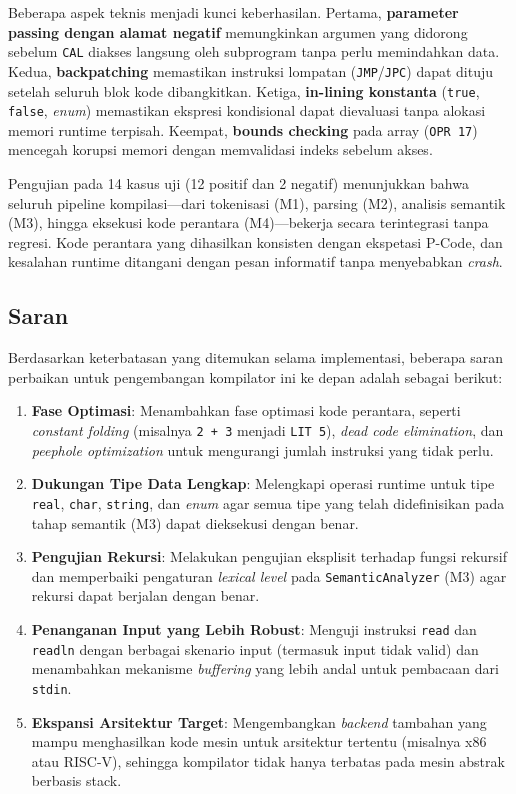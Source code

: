 \documentclass[12pt,a4paper]{article}
\begin{document}
Beberapa aspek teknis menjadi kunci keberhasilan. Pertama, \textbf{parameter
passing dengan alamat negatif} memungkinkan argumen yang didorong sebelum
\texttt{CAL} diakses langsung oleh subprogram tanpa perlu memindahkan data.
Kedua, \textbf{backpatching} memastikan instruksi lompatan
(\texttt{JMP}/\texttt{JPC}) dapat dituju setelah seluruh blok kode dibangkitkan.
Ketiga, \textbf{in-lining konstanta} (\texttt{true}, \texttt{false},
\textit{enum}) memastikan ekspresi kondisional dapat dievaluasi tanpa alokasi
memori runtime terpisah. Keempat, \textbf{bounds checking} pada array
(\texttt{OPR 17}) mencegah korupsi memori dengan memvalidasi indeks sebelum
akses.

Pengujian pada 14 kasus uji (12 positif dan 2 negatif) menunjukkan bahwa seluruh
pipeline kompilasi---dari tokenisasi (M1), parsing (M2), analisis semantik (M3),
hingga eksekusi kode perantara (M4)---bekerja secara terintegrasi tanpa regresi.
Kode perantara yang dihasilkan konsisten dengan ekspetasi P-Code, dan kesalahan
runtime ditangani dengan pesan informatif tanpa menyebabkan \textit{crash}.


\subsection{Saran}

Berdasarkan keterbatasan yang ditemukan selama implementasi, beberapa saran perbaikan untuk pengembangan kompilator ini ke depan adalah sebagai berikut:

\begin{enumerate}
    \item \textbf{Fase Optimasi}: Menambahkan fase optimasi kode perantara, seperti \textit{constant folding} (misalnya \texttt{2 + 3} menjadi \texttt{LIT 5}), \textit{dead code elimination}, dan \textit{peephole optimization} untuk mengurangi jumlah instruksi yang tidak perlu.

    \item \textbf{Dukungan Tipe Data Lengkap}: Melengkapi operasi runtime untuk tipe \texttt{real}, \texttt{char}, \texttt{string}, dan \textit{enum} agar semua tipe yang telah didefinisikan pada tahap semantik (M3) dapat dieksekusi dengan benar.

    \item \textbf{Pengujian Rekursi}: Melakukan pengujian eksplisit terhadap fungsi rekursif dan memperbaiki pengaturan \textit{lexical level} pada \texttt{SemanticAnalyzer} (M3) agar rekursi dapat berjalan dengan benar.

    \item \textbf{Penanganan Input yang Lebih Robust}: Menguji instruksi \texttt{read} dan \texttt{readln} dengan berbagai skenario input (termasuk input tidak valid) dan menambahkan mekanisme \textit{buffering} yang lebih andal untuk pembacaan dari \texttt{stdin}.

    \item \textbf{Ekspansi Arsitektur Target}: Mengembangkan \textit{backend} tambahan yang mampu menghasilkan kode mesin untuk arsitektur tertentu (misalnya x86 atau RISC-V), sehingga kompilator tidak hanya terbatas pada mesin abstrak berbasis stack.
\end{enumerate}
\end{document}
